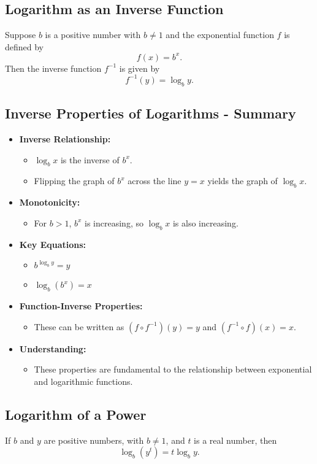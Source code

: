 \subsection{Logarithm as an Inverse Function}
Suppose \(b\) is a positive number with \(b \neq 1\) and the exponential function \(f\) is defined by
\[ f(x) = b^x. \]
Then the inverse function \(f^{-1}\) is given by
\[ f^{-1}(y) = \log_b y. \]

\subsection{Inverse Properties of Logarithms - Summary}
\begin{itemize}
  \item \textbf{Inverse Relationship:}
    \begin{itemize}
      \item \(\log_b x\) is the inverse of \(b^x\).
      \item Flipping the graph of \(b^x\) across the line \(y=x\) yields the graph of \(\log_b x\).
    \end{itemize}
  \item \textbf{Monotonicity:}
    \begin{itemize}
      \item For \(b>1\), \(b^x\) is increasing, so \(\log_b x\) is also increasing.
    \end{itemize}
  \item \textbf{Key Equations:}
    \begin{itemize}
      \item \(b^{\log_b y} = y\)
      \item \(\log_b (b^x) = x\)
    \end{itemize}
  \item \textbf{Function-Inverse Properties:}
    \begin{itemize}
      \item These can be written as \((f \circ f^{-1})(y) = y\) and \((f^{-1} \circ f)(x) = x\).
    \end{itemize}
  \item \textbf{Understanding:}
    \begin{itemize}
      \item These properties are fundamental to the relationship between exponential and logarithmic functions.
    \end{itemize}
\end{itemize}

\subsection{Logarithm of a Power}
If \(b\) and \(y\) are positive numbers, with \(b \neq 1\), and \(t\) is a real number, then
\[ \log_b\left(y^t\right) = t \log_b y. \]

